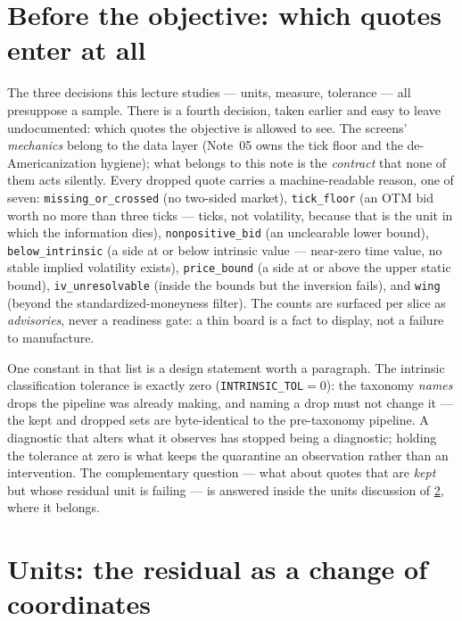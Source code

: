 \documentclass[11pt]{article}
\begin{document}
\section{Before the objective: which quotes enter at all}
\label{sec:quarantine}

The three decisions this lecture studies --- units, measure, tolerance ---
all presuppose a sample.  There is a fourth decision, taken earlier and
easy to leave undocumented: which quotes the objective is allowed to see.
The screens' \emph{mechanics} belong to the data layer (Note~05 owns the
tick floor and the de-Americanization hygiene); what belongs to this note
is the \emph{contract} that none of them acts silently.  Every dropped
quote carries a machine-readable reason, one of seven:
\texttt{missing\_or\_crossed} (no two-sided market), \texttt{tick\_floor}
(an OTM bid worth no more than three ticks --- ticks, not volatility,
because that is the unit in which the information dies),
\texttt{nonpositive\_bid} (an unclearable lower bound),
\texttt{below\_intrinsic} (a side at or below intrinsic value ---
near-zero time value, no stable implied volatility exists),
\texttt{price\_bound} (a side at or above the upper static bound),
\texttt{iv\_unresolvable} (inside the bounds but the inversion fails), and
\texttt{wing} (beyond the standardized-moneyness filter).  The counts are
surfaced per slice as \emph{advisories}, never a readiness gate: a thin
board is a fact to display, not a failure to manufacture.

One constant in that list is a design statement worth a paragraph.  The
intrinsic classification tolerance is exactly zero
(\texttt{INTRINSIC\_TOL}$=0$): the taxonomy \emph{names} drops the
pipeline was already making, and naming a drop must not change it --- the
kept and dropped sets are byte-identical to the pre-taxonomy pipeline.  A
diagnostic that alters what it observes has stopped being a diagnostic;
holding the tolerance at zero is what keeps the quarantine an observation
rather than an intervention.  The complementary question --- what about
quotes that are \emph{kept} but whose residual unit is failing --- is
answered inside the units discussion of \cref{sec:units}, where it
belongs.

\section{Units: the residual as a change of coordinates}
\label{sec:units}
\end{document}
